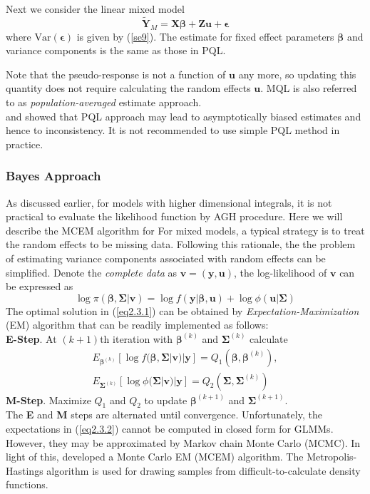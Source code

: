 	Next we consider the linear mixed model 
	\[ \tilde{\bm Y}_M  = \bm {X\beta}+ \bm {Zu}  + \bm \epsilon\] 
	where $\text{Var}(\bm \epsilon) $ is given by (\ref{se9}).  The estimate for fixed effect parameters $\bm \beta$ and variance components is the same as those in PQL. 
	
	Note that the pseudo-response is not a function of $\bm u$ any more, so updating this quantity does not require calculating the random effects $\bm u$. MQL is also referred to as \textit{population-averaged} estimate approach. \\
	
	\cite{pinheiro2006efficient} and \cite{breslow1995bias} showed that PQL approach may lead to asymptotically biased estimates and hence to inconsistency. It is not recommended to use simple PQL method in practice. 
	
	
	\subsubsection{Bayes Approach}
	As discussed earlier, for models with higher dimensional integrals, it is not practical to evaluate the likelihood function by AGH procedure. 
	Here we will describe the MCEM algorithm for 
	For mixed models, a typical strategy is to treat the random effects to be missing data. Following this rationale, the the problem of estimating variance components associated with random effects can be simplified. Denote the \textit{complete data} as $\bm v = (\bm y, \bm u)$, the log-likelihood of $\bm v$ can be expressed as 
	\begin{equation}\label{eq2.3.1}
	\log \pi(\bm \beta , \bm \Sigma|\bm v) = \log f(\bm y|\bm \beta, \bm u) + \log \phi(\bm u|\bm \Sigma)
	\end{equation}  
	The optimal solution in (\ref{eq2.3.1}) can be obtained by \textit{Expectation-Maximization} (EM) algorithm that can be readily implemented as follows:\\
	\textbf{E-Step}. At $(k+1)$th iteration with $\bm \beta^{(k)}$ and $\bm\Sigma^{(k)}$   calculate 
	\begin{equation}\label{eq2.3.2}
	\begin{aligned}
	E_{\bm \beta^{(k)}}[\log f(\bm \beta , \bm \Sigma|\bm v)|\bm y]= Q_1(\bm \beta, \bm \beta^{(k)}), \\
	E_{\bm \Sigma^{(k)}}[\log \phi(\bm \Sigma|\bm v)|\bm y]= Q_2(\bm \Sigma, \bm \Sigma^{(k)})
	\end{aligned}
	\end{equation}
	\textbf{M-Step}.  Maximize $Q_1$ and $Q_2$ to update  $\bm \beta^{(k+1)}$ and $\bm\Sigma^{(k+1)}$. \\
	The \textbf{E} and \textbf{M} steps are alternated until convergence. Unfortunately, the expectations in (\ref{eq2.3.2}) cannot be computed in closed form for GLMMs. However, they may be approximated by Markov chain Monte Carlo (MCMC). In light of this, \cite{mcculloch1997maximum} developed a Monte Carlo EM (MCEM) algorithm. The Metropolis-Hastings algorithm is used for drawing samples from difficult-to-calculate density functions. \\
	
